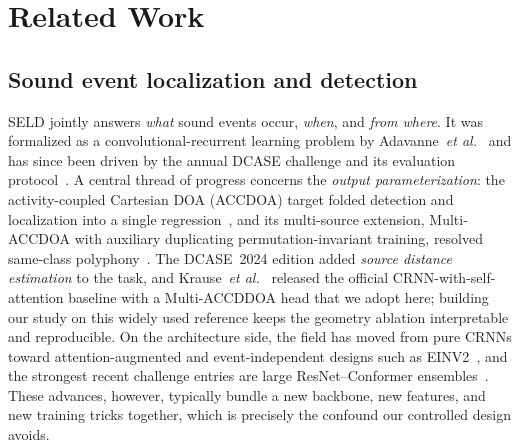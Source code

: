 \section{Related Work}
\label{sec:related}

\subsection{Sound event localization and detection}
SELD jointly answers \emph{what} sound events occur, \emph{when}, and \emph{from
where}. It was formalized as a convolutional-recurrent learning problem
by Adavanne~\emph{et al.}~\cite{adavanne2018seld} and has since been driven by
the annual DCASE challenge and its evaluation
protocol~\cite{politis2020overview}. A central thread of progress concerns the
\emph{output parameterization}: the activity-coupled Cartesian DOA (ACCDOA)
target folded detection and localization into a single
regression~\cite{shimada2021accdoa}, and its multi-source extension,
Multi-ACCDOA with auxiliary duplicating permutation-invariant training, resolved
same-class polyphony~\cite{shimada2022multiaccdoa}. The DCASE~2024 edition added
\emph{source distance estimation} to the task, and Krause~\emph{et
al.}~\cite{krause2024sde} released the official CRNN-with-self-attention baseline
with a Multi-ACCDDOA head that we adopt here; building our study on this widely
used reference keeps the geometry ablation interpretable and reproducible.
On the architecture side, the field has moved from pure CRNNs toward
attention-augmented and event-independent designs such as
EINV2~\cite{cao2021einv2}, and the strongest recent challenge entries are large
ResNet--Conformer ensembles~\cite{dong2025joint}. These advances, however,
typically bundle a new backbone, new features, and new training tricks together,
which is precisely the confound our controlled design avoids.

